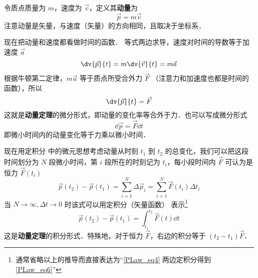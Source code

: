 

令质点质量为 $m$，速度为 $\vec v$，定义其\textbf{动量}为
\begin{equation}
\vec p = m\vec v
\end{equation}
注意动量是矢量，与速度（矢量）的方向相同，且取决于坐标系．

现在把动量和速度都看做时间的函数． 等式两边求导，速度对时间的导数等于加速度 $\vec a$
\begin{equation}
\dv{\vec p}{t} = m \dv{\vec v}{t} = m\vec a
\end{equation}
根据牛顿第二定律，$m\vec a$ 等于质点所受合外力 $\vec F$ （注意力和加速度也都是时间的函数），所以
\begin{equation}
\dv{\vec p}{t} = \vec F
\end{equation}
这就是\textbf{动量定理}的微分形式，即动量的变化率等合外于力．也可以写成微分形式
\begin{equation}\label{PLaw_eq4}
\dd{\vec p} = \vec F \dd{t}
\end{equation}
即微小时间内的动量变化等于力乘以微小时间．

现在用定积分 中的微元思想考虑动量从时刻 $t_1$ 到 $t_2$ 的总变化，我们可以把这段时间划分为 $N$ 段微小时间，第 $i$ 段所在的时刻记为 $t_i$，每小段时间内 $\vec F$ 可认为是恒力 $\vec F(t_i)$
\begin{equation}
\vec p(t_2)-\vec p(t_1) = \sum_{i=1}^{N} \Delta\vec p_i= \sum_{i=1}^{N} \vec F(t_i) \Delta t_i
\end{equation}
当 $N\to\infty, \Delta t\to 0$ 时该式可以用定积分（矢量函数）%
表示\footnote{通常省略以上的推导而直接表达为“\autoref{PLaw_eq4} 两边定积分得到\autoref{PLaw_eq6}”}
\begin{equation}\label{PLaw_eq6}
\vec p(t_2)-\vec p(t_1) = \int_{t_1}^{t_2}\vec F(t) \dd{t}
\end{equation}
这是\textbf{动量定理}的积分形式．特殊地，对于恒力 $\vec F$，右边的积分等于 $(t_2-t_1)\vec F$．